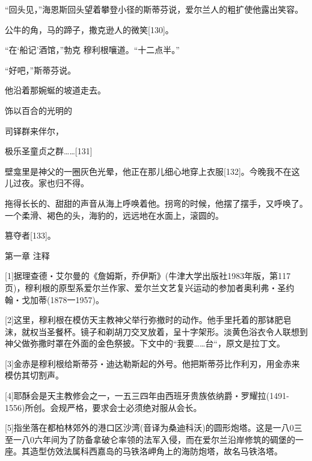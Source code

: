 \documentclass{article}
\begin{document}
“回头见，”海恩斯回头望着攀登小径的斯蒂芬说，爱尔兰人的粗扩使他露出笑容。



公牛的角，马的蹄子，撒克逊人的微笑[130]。



“在‘船记’酒馆，”勃克 \cdot 穆利根嚷道。“十二点半。”



“好吧，”斯蒂芬说。



他沿着那婉蜒的坡道走去。



饰以百合的光明的



司铎群来伴尔，



极乐圣童贞之群……[131]



壁龛里是神父的一圈灰色光晕，他正在那儿细心地穿上衣服[132]。今晚我不在这儿过夜。家也归不得。



拖得长长的、甜甜的声音从海上呼唤着他。拐弯的时候，他摆了摆手，又呼唤了。一个柔滑、褐色的头，海豹的，远远地在水面上，滚圆的。



篡夺者[133]。



\newpage



第一章 注释



[1]据理查德・艾尔曼的《詹姆斯，乔伊斯》(牛津大学出版社1983年版，第117页)，穆利根的原型系爱尔兰作家、爱尔兰文艺复兴运动的参加者奥利弗・圣约翰・戈加蒂(1878一1957)。



[2]这里，穆利根在模仿天主教神父举行弥撤时的动作。他手里托着的那钵肥皂沫，就权当圣餐杯。镜子和剃胡刀交叉放着，呈十字架形。淡黄色浴衣令人联想到神父做弥撒时罩在外面的金色祭披。下文中的“我要……台“，原文是拉丁文。



[3]金赤是穆利根给斯蒂芬・迪达勒斯起的外号。他把斯蒂芬比作利刃，用金赤来模仿其切割声。



[4]耶酥会是天主教修会之一，一五三四年由西班牙贵族依纳爵・罗耀拉(1491-1556)所创。会规严格，要求会士必须绝对服从会长。



[5]指坐落在都柏林郊外的港口区沙湾(音译为桑迪科沃)的圆形炮塔。这是一八0三至一八0六年间为了防备拿破仑率领的法军入侵，而在爱尔兰沿岸修筑的碉堡的一座。其造型仿效法属科西嘉岛的马铁洛岬角上的海防炮塔，故名马铁洛塔。
\end{document}
